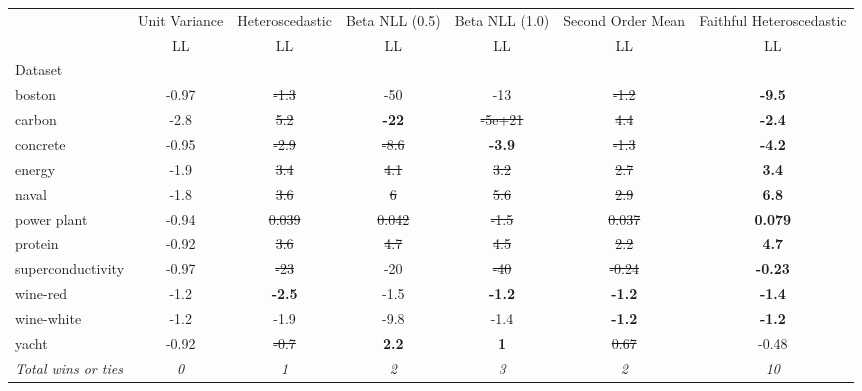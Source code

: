 \begin{tabular}{l|c|c|c|c|c|c}
\toprule
{} & {Unit Variance} & {Heteroscedastic} & {Beta NLL (0.5)} & {Beta NLL (1.0)} & {Second Order Mean} & {Faithful Heteroscedastic} \\
{} & {LL} & {LL} & {LL} & {LL} & {LL} & {LL} \\
{Dataset} & {} & {} & {} & {} & {} & {} \\
\midrule
boston & -0.97 & \sout{-1.3} & -50 & -13 & \sout{-1.2} & \textbf{-9.5} \\
carbon & -2.8 & \sout{5.2} & \textbf{-22} & \sout{-5e+21} & \sout{4.4} & \textbf{-2.4} \\
concrete & -0.95 & \sout{-2.9} & \sout{-8.6} & \textbf{-3.9} & \sout{-1.3} & \textbf{-4.2} \\
energy & -1.9 & \sout{3.4} & \sout{4.1} & \sout{3.2} & \sout{2.7} & \textbf{3.4} \\
naval & -1.8 & \sout{3.6} & \sout{6} & \sout{5.6} & \sout{2.9} & \textbf{6.8} \\
power plant & -0.94 & \sout{0.039} & \sout{0.042} & \sout{-1.5} & \sout{0.037} & \textbf{0.079} \\
protein & -0.92 & \sout{3.6} & \sout{4.7} & \sout{4.5} & \sout{2.2} & \textbf{4.7} \\
superconductivity & -0.97 & \sout{-23} & -20 & \sout{-40} & \sout{-0.24} & \textbf{-0.23} \\
wine-red & -1.2 & \textbf{-2.5} & -1.5 & \textbf{-1.2} & \textbf{-1.2} & \textbf{-1.4} \\
wine-white & -1.2 & -1.9 & -9.8 & -1.4 & \textbf{-1.2} & \textbf{-1.2} \\
yacht & -0.92 & \sout{-0.7} & \textbf{2.2} & \textbf{1} & \sout{0.67} & -0.48 \\
\textit{{Total wins or ties}} & \textit{0} & \textit{1} & \textit{2} & \textit{3} & \textit{2} & \textit{10} \\
\bottomrule
\end{tabular}
